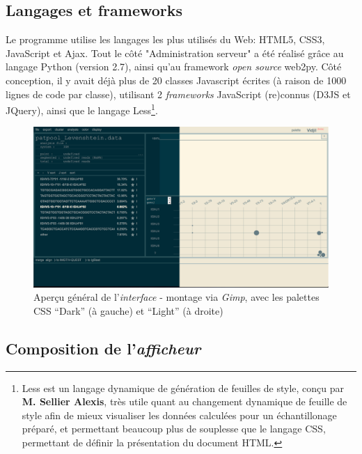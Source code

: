 \documentclass[pdftex,12pt,a4paper]{report}
\begin{document}
\begin{spacing}{1.2}
\subsection{Langages et frameworks}
Le programme utilise les langages les plus utilisés du Web: HTML5, CSS3, JavaScript et Ajax.
\newline
Tout le côté "Administration serveur" a été réalisé grâce au langage Python (version 2.7), ainsi qu'au framework \textit{open source} web2py.
\newline
Côté conception, il y avait déjà plus de 20 classes Javascript écrites (à raison de 1000 lignes de code par classe), utilisant 2 \textit{frameworks} JavaScript (re)connus (D3JS et JQuery), ainsi que le langage Less\footnote{Less est un langage dynamique de génération de feuilles de style, conçu par \textbf{M. Sellier Alexis}, très utile quant au changement dynamique de feuille de style afin de mieux visualiser les données calculées pour un échantillonage préparé, et permettant beaucoup plus de souplesse que le langage CSS, permettant de définir la présentation du document HTML.}.

\begin{figure}[H]
\begin{center}
	\includegraphics[scale=0.35]{img/Montage_Sans_Annotations.jpg}
\end{center}
\caption{Aperçu général de l'\textit{interface} - montage via \textit{Gimp}, avec les palettes CSS ``Dark'' (à gauche) et ``Light'' (à droite)}
\end{figure}

\subsection{Composition de l'\textit{afficheur}}


\end{spacing}
\end{document}
